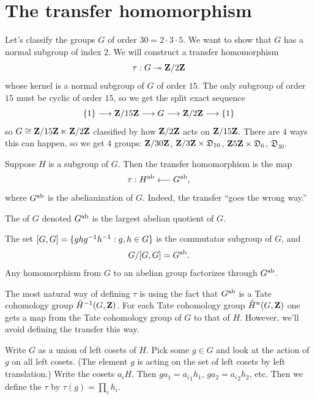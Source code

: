\documentclass[11pt, twoside]{amsart}
\begin{document}
\section{The transfer homomorphism} \label{transfer}
Let's classify the groups $G$ of order $30 = 2\cdot3\cdot5$. We want to show that $G$ has a normal subgroup of index $2$. We will construct a transfer homomorphism 
$$
\tau : G\twoheadrightarrow \mathbf{Z}/2\mathbf{Z}  
$$
whose kernel is a normal subgroup of $G$ of order $15$. The only subgroup of order $15$ must be cyclic of order $15$, so we get the split exact sequence
$$
\{1\} \longrightarrow \mathbf{Z}/{15}\mathbf{Z} \longrightarrow G \longrightarrow \mathbf{Z}/2\mathbf{Z}  \longrightarrow\{1\}
$$
so $G \cong \mathbf{Z}/{15}\mathbf{Z}\ltimes \mathbf{Z}/2\mathbf{Z} $ classified by how $\mathbf{Z}/2\mathbf{Z} $ acts on $\mathbf{Z}/{15}\mathbf{Z}$. There are $4$ ways this can happen, so we get $4$ groups: $\mathbf{Z}/ {30}\mathbf{Z}$, $\mathbf{Z}/3\mathbf{Z}  \times \mathfrak{D}_{10}$, $\mathbf{Z} {5}\mathbf{Z} \times \mathfrak{D}_6$, $\mathfrak{D}_{30}$. 

Suppose $H$ is a subgroup of $G$. Then the transfer homomorphism is the map
$$
\tau : H\textsuperscript{ab} \longleftarrow G\textsuperscript{ab},
$$
where $G\textsuperscript{ab}$ is the abelianization of $G$. Indeed, the transfer ``goes the wrong way.''

\begin{definition}
The  of $G$ denoted $G\textsuperscript{ab}$ is the largest abelian quotient of $G$.
\end{definition}

The set $[G,G] = \{ ghg^{-1} h^{-1} : g,h\in G\}$ is the commutator subgroup of $G$, and 
$$
G / [G,G] = G\textsuperscript{ab}.
$$
Any homomorphism from $G$ to an abelian group factorizes through $G\textsuperscript {ab}$.

The most natural way of defining $\tau$ is using the fact that $G\textsuperscript {ab}$ is a  Tate cohomology group $\hat {H}^{-1} (G,\mathbf{Z})$. For each Tate cohomology group $\hat H^n (G,\mathbf{Z})$ one gets a map from the Tate cohomology group of $G$ to that of $H$. However, we'll avoid defining the transfer this way.


\begin{definition}
Write $G$ as a union of left cosets of $H$. Pick some $g\in G$ and look at the action of $g$ on all left cosets. (The element $g$ is acting on the set of left cosets by left translation.) Write the cosets $a_iH$. Then $ga_1 = {a_i}_1h_1$, $ga_2 = {a_i}_2h_2$, etc. Then we define the  $\tau$ by $\tau (g) = \prod_i h_i$.
\end{definition}
\end{document}

